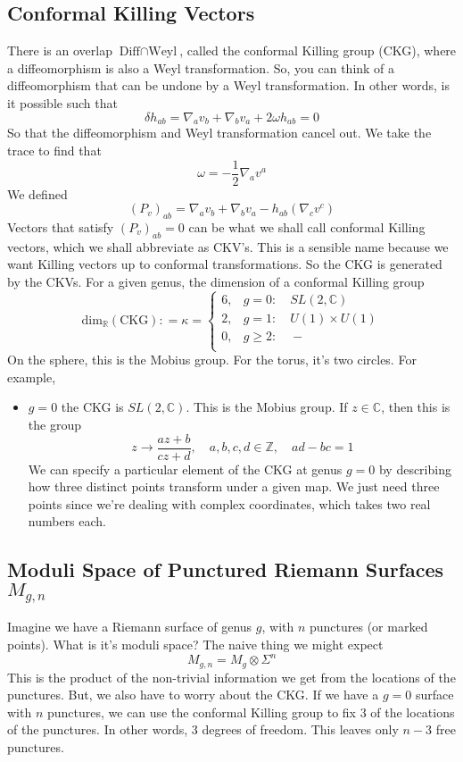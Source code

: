 \documentclass[11pt, oneside]{article}   	%
\theoremstyle{slanted}
\begin{document}
\subsection{Conformal Killing Vectors}
 There is an overlap $ \text{Diff} \cap \text{Weyl}$, 
 called the conformal Killing group (CKG), where 
 a diffeomorphism is also a Weyl transformation. 
So, you can think of a diffeomorphism
that can be undone by a Weyl transformation. 
In other words, is it possible such that 
\[
	\delta h _{ ab }  = \nabla _a v _ b  +  \nabla _ b v _ a  + 2 \omega h _{ ab }  = 0 
\] So that the diffeomorphism
and Weyl transformation cancel out.
We take the trace to find that 
\[
 \omega   =  - \frac{1}{2 } \nabla _ a v ^ a 
\] We defined 
\[
	\left( P _ v  \right)  _{ ab }  = \nabla _ a v _ b + \nabla _ b v _ a  - 
	h _{ ab } \left( \nabla _ c v ^ c  \right)  
\] Vectors that satisfy 
$ \left( P _ v  \right)  _{ ab }  =0 $ can be what we 
shall call conformal Killing vectors, 
which we shall abbreviate as CKV's. 
This is a sensible name because 
we want Killing vectors up to conformal transformations. 
So the CKG is generated by 
the CKVs. 
For a given genus, the dimension of a conformal 
Killing group 
\[
	\text{dim}_{\mathbb{R }}\left( \text{CKG} \right) : = \kappa  = 
	\begin{cases}
		6, & g  =0: \quad SL\left( 2, \mathbb{ C } \right)  \\
		2, & g  = 1: \quad U \left( 1  \right) \times U \left( 1 \right)    \\
		0, & g \geq 2: \quad  - \\ 
	\end{cases}
\] On the sphere, this is 
the Mobius group. For the torus, it's two 
circles. 
For example, 
\begin{itemize}
	\item $ g  = 0$ the CKG is $ SL \left( 2, \mathbb{ C }  \right)  $. 
		This is the Mobius group. If $ z \in \mathbb{ C } $, 
		then this is the group 
		 \[
			 z \to \frac{az +  b }{ c z + d } , \quad a, b, c, d \in \mathbb{ Z }, 
			 \quad ad  - b c  =  1 
		\] We can specify a particular 
		element of the CKG at genus $ g = 0 $ by 
		describing how three distinct points transform under 
		a given map. 
		We just need three points since 
		we're dealing with complex coordinates, 
		which takes two real numbers each. 
\end{itemize}

\subsection{Moduli Space of Punctured Riemann Surfaces $ M _{ g, n }  $}
Imagine we have a Riemann 
surface of genus $ g $, 
with $ n $ punctures (or marked points). 
What is it's moduli space? 
The naive thing we might expect 
\[
 M _{ g, n  }  = M _ g \otimes \Sigma ^ n 
\] This is the product of the 
non-trivial information we get from the 
locations of the punctures. 
But, we also have to worry about the CKG. 
If we have a $ g = 0  $ surface 
with $ n $ punctures, we 
can use the conformal Killing group to fix 3 of the 
locations of the punctures. In other words, 3 degrees of 
freedom. This leaves only $ n  - 3 $ free punctures. 
\end{document}
